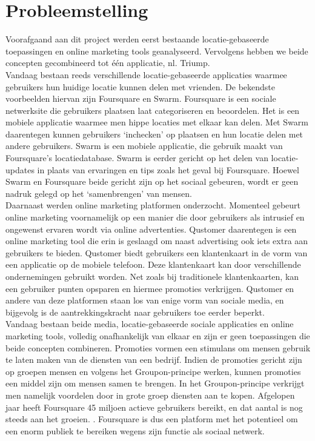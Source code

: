 \chapter{Probleemstelling}
Voorafgaand aan dit project werden eerst bestaande locatie-gebaseerde toepassingen en online marketing tools geanalyseerd. Vervolgens hebben we beide concepten gecombineerd tot één applicatie, nl. Triump.\\

Vandaag bestaan reeds verschillende locatie-gebaseerde applicaties waarmee gebruikers hun huidige locatie kunnen delen met vrienden. 
De bekendste voorbeelden hiervan zijn Foursquare\cite{foursquare} en Swarm\cite{swarm}.
Foursquare is een sociale netwerksite die gebruikers plaatsen laat categoriseren en beoordelen.
Het is een mobiele applicatie waarmee men hippe locaties met elkaar kan delen. Met Swarm daarentegen kunnen gebruikers `inchecken' op plaatsen en hun locatie delen met andere gebruikers. Swarm is een mobiele applicatie, die gebruik maakt van Foursquare's locatiedatabase. Swarm is eerder gericht op het delen van locatie-updates in plaats van ervaringen en tips zoals het geval bij Foursquare.
Hoewel Swarm en Foursquare beide gericht zijn op het sociaal gebeuren, wordt er geen nadruk gelegd op het `samenbrengen' van mensen. \\

Daarnaast werden online marketing platformen onderzocht. Momenteel gebeurt online marketing voornamelijk op een manier die door gebruikers als intrusief en ongewenst ervaren wordt via online advertenties. Qustomer\cite{qustomer} daarentegen is een online marketing tool die erin is geslaagd om naast advertising ook iets extra aan gebruikers te bieden. Qustomer biedt gebruikers een klantenkaart in de vorm van een applicatie op de mobiele telefoon. Deze klantenkaart kan door verschillende ondernemingen gebruikt worden. Net zoals bij traditionele klantenkaarten, kan een gebruiker punten opsparen en hiermee promoties verkrijgen. Qustomer en andere van deze platformen staan los van enige vorm van sociale media, en bijgevolg is de aantrekkingskracht naar gebruikers toe eerder beperkt.\\

Vandaag bestaan beide media, locatie-gebaseerde sociale applicaties en online marketing tools, volledig onafhankelijk van elkaar en zijn er geen toepassingen die beide concepten combineren. 
Promoties vormen een stimulans om mensen gebruik te laten maken van de diensten van een bedrijf. Indien de promoties gericht zijn op groepen mensen en volgens het Groupon-principe werken, kunnen promoties een middel zijn om mensen samen te brengen.
In het Groupon-principe verkrijgt men namelijk voordelen door in grote groep diensten aan te kopen.
Afgelopen jaar heeft Foursquare 45 miljoen actieve gebruikers bereikt, en dat aantal is nog steeds aan het groeien. \cite{users}. Foursquare is dus een platform met het potentieel om een enorm publiek te bereiken wegens zijn functie als sociaal netwerk.\\ 

